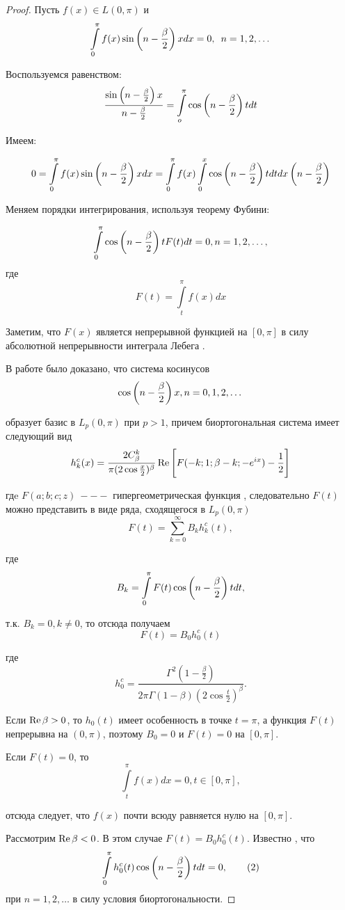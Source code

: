 \documentclass[oneside, final, 14pt]{extreport}
\begin{document}
	
	\begin{proof}
		Пусть $f(x) \in L(0, \pi)$ и $$\int\limits_0^{\pi}f(x)\sin\left(n - \frac{\beta}{2}\right)xdx = 0, \enspace n = 1, 2, \dots$$
		
		Воспользуемся равенством:
		$$
			\frac{\sin\left(n - \frac{\beta}{2}\right)x}{n - \frac{\beta}{2}} = \int\limits_o^\pi\cos\left(n - \frac{\beta}{2}\right)tdt
		$$
		
		Имеем:
		
		$$
			 0 = \int\limits_0^\pi f(x)\sin\left(n - \frac{\beta}{2}\right)xdx = \int\limits_0^\pi f(x) \int\limits_0^x\cos\left(n - \frac{\beta}{2}\right)tdtdx\left(n - \frac{\beta}{2}\right)
		$$
		
		Меняем порядки интегрирования, используя теорему Фубини:
	
		$$
			\int\limits_0^\pi\cos\left(n - \frac{\beta}{2}\right)tF(t)dt = 0, n = 1, 2, \dots,
		$$
		где
		$$
			F(t) = \int\limits_t^\pi f(x) dx
		$$
		
		Заметим, что $F(x)$ является непрерывной функцией на $[0, \pi]$ в силу абсолютной непрерывности 
		интеграла Лебега \cite{kolmogorov}.
		
		В работе \cite{moiseev-dan} было доказано, что система косинусов
		$$
			\cos\left(n - \frac{\beta}{2}\right)x, n = 0, 1, 2, \dots
		$$
		
		образует базис в $L_p(0, \pi)$ при $p > 1$, причем биортогональная система имеет следующий вид
		$$
			h^c_k(x) = \frac{2C^k_\beta}{\pi(2\cos\frac{x}{2})^\beta}\operatorname{Re}\Bigg[F(-k; 1; \beta - k; -e^{ix}) - \frac{1}{2}\Bigg]
		$$
		
		гдe $F(a; b; c; z) ~--- $ гипергеометрическая функция \cite{bateman}, следовательно $F(t)$ можно представить
		в виде ряда, сходящегося в $L_p(0, \pi)$
		$$
			F(t) = \sum\limits^\infty_{k = 0}B_k h^c_k(t), 
		$$
		
		где 
		$$
			B_k = \int\limits_0^\pi F(t) \cos\left(n - \frac{\beta}{2}\right)tdt,
		$$
		
		т.к. $B_k = 0, k \neq 0$, то отсюда получаем 
		$$
			F(t) = B_0 h^c_0(t)
		$$
		
		где 
		$$
			h^c_0 = \frac{\Gamma^2(1 - \frac{\beta}{2})}{2\pi \Gamma(1- \beta)(2\cos\frac{t}{2})^\beta}.
		$$
		
		Если $\operatorname{Re}\beta > 0$, то $h_0(t)$ имеет особенность в точке $t = \pi$, а функция $F(t)$ непрерывна на $(0, \pi)$,
		поэтому $B_0 = 0$ и $F(t) = 0$ на $[0, \pi]$.
		
		Если $F(t) = 0$, то 
		$$
			\int\limits_t^\pi f(x)dx = 0, t \in [0, \pi],
		$$
		
		отсюда следует, что $f(x)$ почти всюду равняется нулю на $[0, \pi]$.
		
		Рассмотрим $\operatorname{Re}\beta < 0$. В этом случае $F(t) = B_0h^c_0(t)$. Известно \cite{moiseev-dan}, что
		\begin{equation}
			\int\limits_0^\pi h^c_0(t)\cos\left(n - \frac{\beta}{2}\right)tdt = 0, \tag{2} \label{eq:2}
		\end{equation}
		при $n = 1, 2, \ldots$ в силу условия биортогональности.
		

\end{proof}
\end{document}
